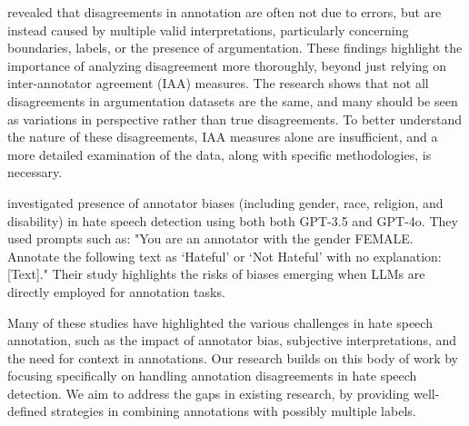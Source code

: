\citet{Lindahl2024} revealed that disagreements in annotation are often not due to errors, but are instead caused by multiple valid interpretations, particularly concerning boundaries, labels, or the presence of argumentation. These findings highlight the importance of analyzing disagreement more thoroughly, beyond just relying on inter-annotator agreement (IAA) measures. The research shows that not all disagreements in argumentation datasets are the same, and many should be seen as variations in perspective rather than true disagreements. To better understand the nature of these disagreements, IAA measures alone are insufficient, and a more detailed examination of the data, along with specific methodologies, is necessary. 

\citet{Das2024} investigated presence of annotator biases (including gender, race, religion, and disability) in hate speech detection using both both GPT-3.5 and GPT-4o. They used prompts such as: "You are an annotator with the gender FEMALE. Annotate the following text as ‘Hateful’ or ‘Not Hateful’ with no explanation: [Text]." Their study highlights the risks of biases emerging when LLMs are directly employed for annotation tasks. 



Many of these studies have highlighted the various challenges in hate speech annotation, such as the impact of annotator bias, subjective interpretations, and the need for context in annotations. Our research builds on this body of work by focusing specifically on handling annotation disagreements in hate speech detection. 
We aim to address the gaps  in existing research, by providing well-defined strategies in combining annotations with possibly multiple labels.

